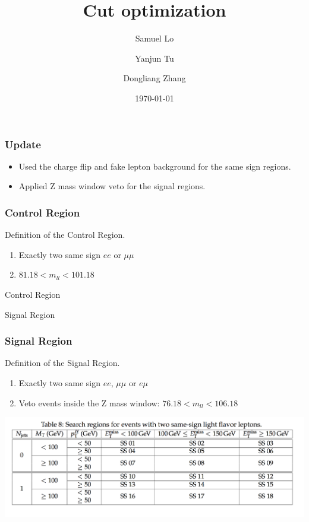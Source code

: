 \documentclass[mathserif,serif]{beamer}
\title{Cut optimization}
\author
{
Samuel Lo \inst{1}
\and
Yanjun Tu  \inst{1}
\and
Dongliang Zhang  \inst{2}
}
\institute
{
\inst{1}
The University of Hong Kong
\and
\inst{2}
University of Michigan
}
\date{\today}
\begin{document}
\frame{\titlepage}

\begin{frame}
\frametitle{Update}
\begin{itemize}
\normalsize
\item Used the charge flip and fake lepton background for the same sign regions.
\item Applied Z mass window veto for the signal regions.
\end{itemize}
\end{frame}

\begin{frame}
\frametitle{Control Region}
Definition of the Control Region.
\begin{enumerate}
\item Exactly two same sign $ee$ or $\mu\mu$
\item $81.18 < m_{ll} < 101.18$
\end{enumerate}
\end{frame}

\begin{frame}
\begin{center}
\huge
Control Region
\end{center}
\end{frame}



\def \PathToPlot {../plot}


\begin{frame}
\begin{center}
\huge
Signal Region
\end{center}
\end{frame}

\begin{frame}
\frametitle{Signal Region}
Definition of the Signal Region.
\begin{enumerate}
\item Exactly two same sign $ee$, $\mu\mu$ or $e\mu$
\item Veto events inside the Z mass window: $76.18 < m_{ll} < 106.18$
\end{enumerate}
\includegraphics[width=1\textwidth]{data/SR.png}
\end{frame}
\end{document}

